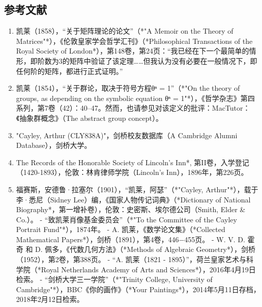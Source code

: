 \subsection{参考文献}  
\begin{enumerate}
\item 凯莱（1858），“关于矩阵理论的论文”（*"A Memoir on the Theory of Matrices"*），《伦敦皇家学会哲学汇刊》（*Philosophical Transactions of the Royal Society of London*），第148卷，第24页：“我已经在下一个最简单的情形，即阶数为3的矩阵中验证了该定理……但我认为没有必要在一般情况下，即任何阶的矩阵，都进行正式证明。”  
\item 凯莱（1854），“关于群论，取决于符号方程θⁿ = 1”（*"On the theory of groups, as depending on the symbolic equation θⁿ = 1"*），《哲学杂志》第四系列，第7卷（42）：40–47。然而，也请参见对该定义的批评：MacTutor：《抽象群概念》（The abstract group concept）。  
\item "Cayley, Arthur (CLY838A)"，剑桥校友数据库（A Cambridge Alumni Database），剑桥大学。  
\item The Records of the Honorable Society of Lincoln's Inn*, 第II卷，入学登记（1420-1893），伦敦：林肯律师学院（Lincoln's Inn），1896年，第226页。  
\item 福赛斯，安德鲁·拉塞尔（1901），“凯莱，阿瑟”（*"Cayley, Arthur"*），载于李·悉尼（Sidney Lee）编，《国家人物传记词典》（*Dictionary of National Biography*，第一增补卷），伦敦：史密斯、埃尔德公司（Smith, Elder & Co.）。  
- “致凯莱肖像基金委员会”（*"To the Committee of the Cayley Portrait Fund"*），1874年。  
- A. 凯莱，《数学论文集》（*Collected Mathematical Papers*），剑桥（1891），第4卷，446−455页。  
- W. V. D. 霍奇 和 D. 佩多，《代数几何方法》（*Methods of Algebraic Geometry*），剑桥（1952），第2卷，第388页。  
- “A. 凯莱（1821 - 1895）”，荷兰皇家艺术与科学院（*Royal Netherlands Academy of Arts and Sciences*），2016年4月19日检索。  
- “剑桥大学三一学院”（*"Trinity College, University of Cambridge"*），BBC《你的画作》（*Your Paintings*），2014年5月11日存档，2018年2月12日检索。  
\end{enumerate}